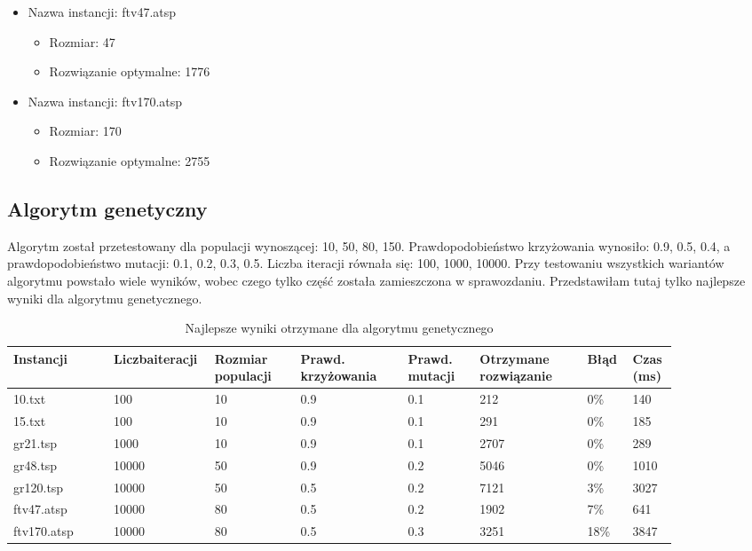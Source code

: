 \documentclass[12pt,a4paper,titlepage]{article}
\begin{document}
\begin{itemize}
    \item Nazwa instancji: ftv47.atsp
    \begin{itemize}
        \item Rozmiar: 47
        \item Rozwiązanie optymalne: 1776
    \end{itemize}
    \item Nazwa instancji: ftv170.atsp
    \begin{itemize}
        \item Rozmiar: 170
        \item Rozwiązanie optymalne: 2755
    \end{itemize}
\end{itemize}

\subsection{Algorytm genetyczny}
Algorytm został przetestowany dla populacji wynoszącej: 10, 50, 80, 150. Prawdopodobieństwo krzyżowania wynosiło: 0.9, 0.5, 0.4, a prawdopodobieństwo mutacji: 0.1, 0.2, 0.3, 0.5. Liczba iteracji równała się: 100, 1000, 10000.
Przy testowaniu wszystkich wariantów algorytmu powstało wiele wyników, wobec czego tylko część została zamieszczona w sprawozdaniu. Przedstawiłam tutaj tylko najlepsze wyniki dla algorytmu genetycznego.
\begin{table}[H]
	\caption{Najlepsze wyniki otrzymane dla algorytmu genetycznego}
    \centering
	\begin{tabular}{|p{0.14\linewidth}|p{0.09\linewidth}|p{0.12\linewidth}|p{0.15\linewidth}|p{0.1\linewidth}|p{0.15\linewidth}|p{0.06\linewidth}|p{0.06\linewidth}|}
		\hline
        Instancji & Liczba\newline iteracji & Rozmiar populacji & Prawd. krzyżowania & Prawd. mutacji & Otrzymane rozwiązanie & Błąd & Czas (ms) \\
		\hline
        10.txt & 100 & 10 & 0.9 & 0.1 & 212 & 0\% & 140 \\
        \hline
        15.txt & 100 & 10 & 0.9 & 0.1 & 291 & 0\% & 185 \\
        \hline
        gr21.tsp & 1000 & 10 & 0.9 & 0.1 & 2707 & 0\% & 289 \\
        \hline
        gr48.tsp & 10000 & 50 & 0.9 & 0.2 & 5046 & 0\% & 1010 \\
        \hline
        gr120.tsp & 10000 & 50 & 0.5 & 0.2 & 7121 & 3\% & 3027 \\
        \hline
        ftv47.atsp & 10000 & 80 & 0.5 & 0.2 & 1902 & 7\% & 641 \\
        \hline
        ftv170.atsp & 10000 & 80 & 0.5 & 0.3 & 3251 & 18\% & 3847 \\
        \hline
    \end{tabular}
\end{table}
\end{document}
